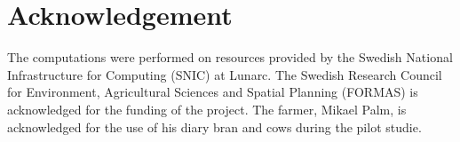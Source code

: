 \documentclass{cta-author}
\begin{document}
\section{Acknowledgement}
The computations were performed on resources provided by the Swedish National Infrastructure for Computing (SNIC) at Lunarc. The Swedish Research Council for Environment, Agricultural Sciences and 
Spatial Planning (FORMAS) is acknowledged 
for the funding of the project. The farmer, Mikael Palm, is acknowledged for the use of his diary bran and cows during the pilot studie.




{\parindent0pt
\parskip8pt

}
\end{document}
